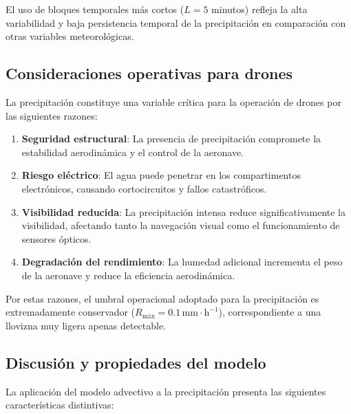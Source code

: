 \documentclass[
  spanish,
  us-letterpaper,
]{scrreprt}
\numberwithin{equation}{section}
\begin{document}
El uso de bloques temporales más cortos (\(L = 5\) minutos) refleja la
alta variabilidad y baja persistencia temporal de la precipitación en
comparación con otras variables meteorológicas.

\subsection{Consideraciones operativas para
drones}\label{consideraciones-operativas-para-drones}

La precipitación constituye una variable crítica para la operación de
drones por las siguientes razones:

\begin{enumerate}
\def\labelenumi{\arabic{enumi}.}
\item
  \textbf{Seguridad estructural}: La presencia de precipitación
  compromete la estabilidad aerodinámica y el control de la aeronave.
\item
  \textbf{Riesgo eléctrico}: El agua puede penetrar en los
  compartimentos electrónicos, causando cortocircuitos y fallos
  catastróficos.
\item
  \textbf{Visibilidad reducida}: La precipitación intensa reduce
  significativamente la visibilidad, afectando tanto la navegación
  visual como el funcionamiento de sensores ópticos.
\item
  \textbf{Degradación del rendimiento}: La humedad adicional incrementa
  el peso de la aeronave y reduce la eficiencia aerodinámica.
\end{enumerate}

Por estas razones, el umbral operacional adoptado para la precipitación
es extremadamente conservador
(\(R_{\text{máx}} = 0.1 \, \mathrm{mm \cdot h^{-1}}\)), correspondiente
a una llovizna muy ligera apenas detectable.

\subsection{Discusión y propiedades del
modelo}\label{discusiuxf3n-y-propiedades-del-modelo-2}

La aplicación del modelo advectivo a la precipitación presenta las
siguientes características distintivas:
\end{document}
